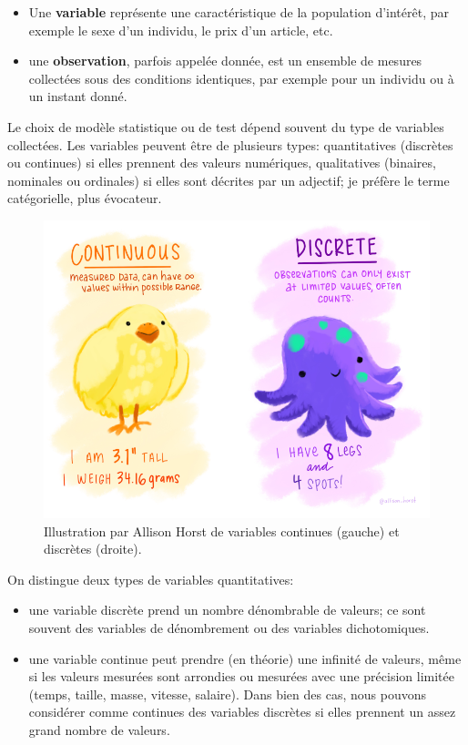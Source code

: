 \documentclass[
  11pt,
  letterpaper,
]{book}
\providecommand{\tightlist}{%
  \setlength{\itemsep}{0pt}\setlength{\parskip}{0pt}}
\theoremstyle{definition}
\theoremstyle{definition}
\theoremstyle{definition}
\theoremstyle{remark}
\begin{document}
\begin{itemize}
\tightlist
\item
  Une \textbf{variable} représente une caractéristique de la population d'intérêt, par exemple le sexe d'un individu, le prix d'un article, etc.
\item
  une \textbf{observation}, parfois appelée donnée, est un ensemble de mesures collectées sous des conditions identiques, par exemple pour un individu ou à un instant donné.
\end{itemize}

Le choix de modèle statistique ou de test dépend souvent du type de variables collectées. Les variables peuvent être de plusieurs types: quantitatives (discrètes ou continues) si elles prennent des valeurs numériques, qualitatives (binaires, nominales ou ordinales) si elles sont décrites par un adjectif; je préfère le terme catégorielle, plus évocateur.

\begin{figure}

{\centering \includegraphics[width=0.7\linewidth]{figures/continuous_discrete} 

}

\caption{Illustration par Allison Horst de variables continues (gauche) et discrètes (droite).}\label{fig:variablesquanti}
\end{figure}

On distingue deux types de variables quantitatives:

\begin{itemize}
\tightlist
\item
  une variable discrète prend un nombre dénombrable de valeurs; ce sont souvent des variables de dénombrement ou des variables dichotomiques.
\item
  une variable continue peut prendre (en théorie) une infinité de valeurs, même si les valeurs mesurées sont arrondies ou mesurées avec une précision limitée (temps, taille, masse, vitesse, salaire). Dans bien des cas, nous pouvons considérer comme continues des variables discrètes si elles prennent un assez grand nombre de valeurs.
\end{itemize}
\end{document}
